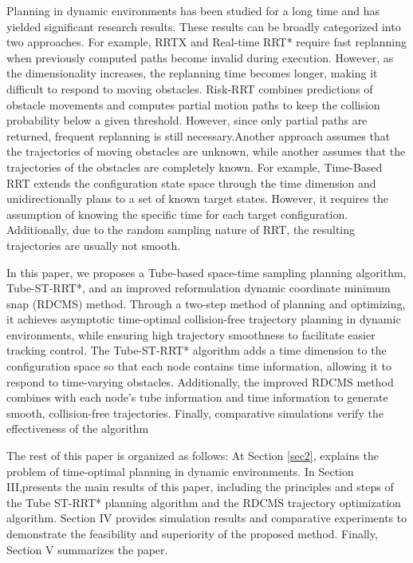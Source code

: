 \documentclass[conference]{IEEEtran}
\begin{document}
        Planning in dynamic environments has been studied for a long time and has yielded significant research results. These results can be broadly categorized into two approaches. For example, RRTX\cite{b3} and Real-time RRT* \cite{b4} require fast replanning when previously computed paths become invalid during execution. However, as the dimensionality increases, the replanning time becomes longer, making it difficult to respond to moving obstacles. Risk-RRT \cite{b5} combines predictions of obstacle movements and computes partial motion paths to keep the collision probability below a given threshold. However, since only partial paths are returned, frequent replanning is still necessary.Another approach assumes that the trajectories of moving obstacles are unknown, while another assumes that the trajectories of the obstacles are completely known. For example, Time-Based RRT \cite{b6} extends the configuration state space through the time dimension and unidirectionally plans to a set of known target states. However, it requires the assumption of knowing the specific time for each target configuration. Additionally, due to the random sampling nature of RRT, the resulting trajectories are usually not smooth.

        In this paper, we proposes a Tube-based space-time sampling planning algorithm, Tube-ST-RRT*, and an improved reformulation dynamic coordinate minimum snap (RDCMS) method. Through a two-step method of  planning and optimizing, it achieves asymptotic time-optimal collision-free trajectory planning in dynamic environments, while ensuring high trajectory smoothness to facilitate easier tracking control. The Tube-ST-RRT* algorithm adds a time dimension to the configuration space so that each node contains time information, allowing it to respond to time-varying obstacles. Additionally, the improved RDCMS method combines with each node's tube information and time information to generate smooth, collision-free trajectories. Finally, comparative simulations verify the effectiveness of the algorithm

        The rest of this paper is organized as follows: At Section \ref{sec2}, explains the problem of time-optimal planning in dynamic environments. In Section III,presents the main results of this paper, including the principles and steps of the Tube ST-RRT* planning algorithm and the RDCMS trajectory optimization algorithm. Section IV provides simulation results and comparative experiments to demonstrate the feasibility and superiority of the proposed method. Finally, Section V summarizes the paper.
\end{document}
